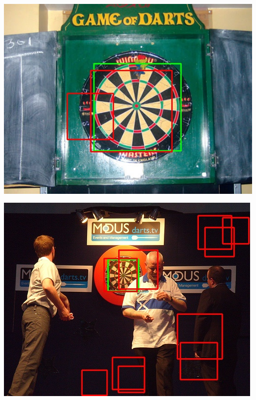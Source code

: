 \documentclass{article}
\begin{document}
\begin{multicols}{2}
\begin{multicols}{3}
    \includegraphics[width=\linewidth]{dart1-dart.jpg}\par
    \includegraphics[width=\linewidth]{dart6-dart.jpg}\par

\end{multicols}
\end{multicols}
\end{document}
